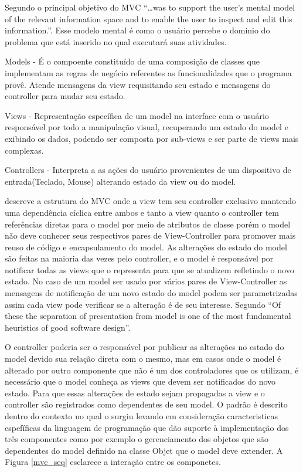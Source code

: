 Segundo  o principal objetivo do MVC ``\ldots was to
support the user's mental model of the relevant information space and to enable
the user to inspect and edit this information.''. Esse modelo mental é como o
usuário percebe o dominio do problema que está inserido no qual executará suas
atividades.


Models - É o compoente constituído de uma composição de classes que implementam
as regras de negócio referentes as funcionalidades que o programa provê. Atende
mensagens da view requisitando seu estado e mensagens do controller para mudar
seu estado.

Views - Representação específica de um model na interface com o usuário
responsável por todo a manipulação visual, recuperando um estado do
model e exibindo os dados, podendo ser composta por sub-views e ser parte de
views mais complexas.

Controllers - Interpreta a as ações do usuário provenientes de um dispositivo de
entrada(Teclado, Mouse) alterando estado da view ou do model.




 descreve a estrutura do MVC onde a view tem seu
controller exclusivo mantendo uma dependência cíclica entre ambos e tanto a view
quanto o controller tem referências diretas para o model por meio de atributos
de classe porém o model não deve conhecer seus respectivos pares de
View-Controller para promover mais reuso de código e encapsulamento do model. As
alterações do estado do model são feitas na maioria das vezes pelo controller, e
o model é responsável por notificar todas as views que o representa para que
se atualizem refletindo o novo estado. No caso de um model ser usado por vários
pares de View-Controller as mensagens de notificação de um novo estado do model
podem ser parametrizadas assim cada view pode verificar se a alteração é de seu
interesse. Segundo  ``Of these the separation of presentation
from model is one of the most fundamental heuristics of good software design''.

O controller poderia ser o responsável por publicar as alterações no estado do
model devido sua relação direta com o mesmo, mas em casos onde o model é
alterado por outro componente que não é um dos controladores que os utilizam, é
necessário que o model conheça as views que devem ser notificados do novo
estado. Para que essas alterações de estado sejam propagadas a view e o
controller são registrados como dependentes de seu model. O padrão é descrito
dentro do contexto no qual o surgiu levando em consideração caracteristicas
espefíficas da  linguagem de programação que dão suporte à implementação dos
três componentes como por exemplo o gerenciamento dos objetos que são
dependentes do model definido na classe Objet que o model deve extender. A
Figura \ref{mvc_seq} esclarece a interação entre os componetes.

